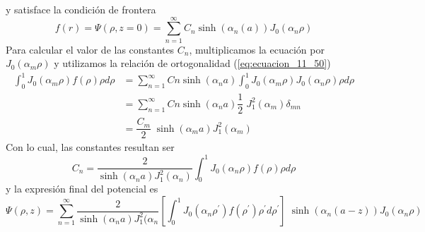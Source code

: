 y satisface la condición de frontera
\begin{equation}
f(r) = \Psi(\rho, z=0) =  \sum_{n=1}^{\infty} C_{n} \sinh(\alpha_{n} (a)) J_{0}(\alpha_{n} \rho)
\label{eq:ecuacion_05_99}
\end{equation}
Para calcular el valor de las constantes $C_{n}$, multiplicamos la ecuación por $J_{0}(\alpha_{m} \rho)$ y utilizamos la relación de ortogonalidad (\ref{eq:ecuacion_11_50})
\[ \begin{split}
\int_{0}^{1} J_{0}(\alpha_{m} \rho) f(\rho) \rho d \rho &= \sum_{n=1}^{\infty} C{n} \sinh (\alpha_{n} a) \int_{0}^{1} J_{0} (\alpha_{m} \rho) J_{0} (\alpha_{n} \rho) \rho d \rho \\
&= \sum_{n=1}^{\infty} C{n} \sinh (\alpha_{n} a) \dfrac{1}{2} \; J_{1}^{2} (\alpha_{m}) \delta_{mn} \\
&= \dfrac{C_{m}}{2} \; \sinh (\alpha_{m} a) J_{1}^{2} (\alpha_{m})
\end{split} \]
Con lo cual, las constantes resultan ser
\begin{equation}
C_{n} = \dfrac{2}{\sinh ( \alpha_{n} a) J_{1}^{2} (\alpha_{n})} \int_{0}^{1} J_{0} (\alpha_{n} \rho) f(\rho) \rho d \rho
\label{eq:ecuacion_05_100}
\end{equation}
y la expresión final del potencial es
\begin{equation}
\Psi(\rho, z) = \sum_{n=1}^{\infty} \dfrac{2}{\sinh (\alpha_{n} a) J_{1}^{2}(\alpha_{n}} \left[ \int_{0}^{1} J_{0} (\alpha_{n} \rho^{\prime}) f(\rho^{\prime}) \rho^{\prime} d \rho^{\prime} \right] \; \sinh (\alpha_{n} (a -z)) J_{0} (\alpha_{n} \rho)
\label{eq:ecuacion_05_101}
\end{equation}
